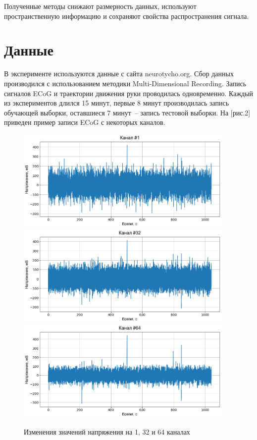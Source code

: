 \documentclass{mipt-thesis-bs}
\begin{document}
Полученные  методы снижают размерность данных, используют пространственную информацию и сохраняют свойства распространения сигнала.

\section{Данные}

В эксперименте используются данные с сайта neurotycho.org. Сбор данных производился с использованием методики Multi-Dimensional Recording. Запись сигналов ECoG и траектории движения руки проводилась одновременно. Каждый из экспериментов длился 15 минут, первые 8 минут производилась запись обучающей выборки, оставшиеся 7 минут~– запись тестовой выборки. На [рис.2] приведен пример записи ECoG с некоторых каналов.

\begin{figure}
\begin{center}
	\includegraphics[width=300pt,height=\textheight,keepaspectratio]{imgs/Raw_ch1.png}
	\includegraphics[width=300pt,height=\textheight,keepaspectratio]{imgs/Raw_ch32.png}
	\includegraphics[width=300pt,height=\textheight,keepaspectratio]{imgs/Raw_ch64.png}
	\caption{Изменения значений напряжения на 1, 32 и 64 каналах}	
	\label{fig:raw}
	\end{center}
\end{figure}
\end{document}
